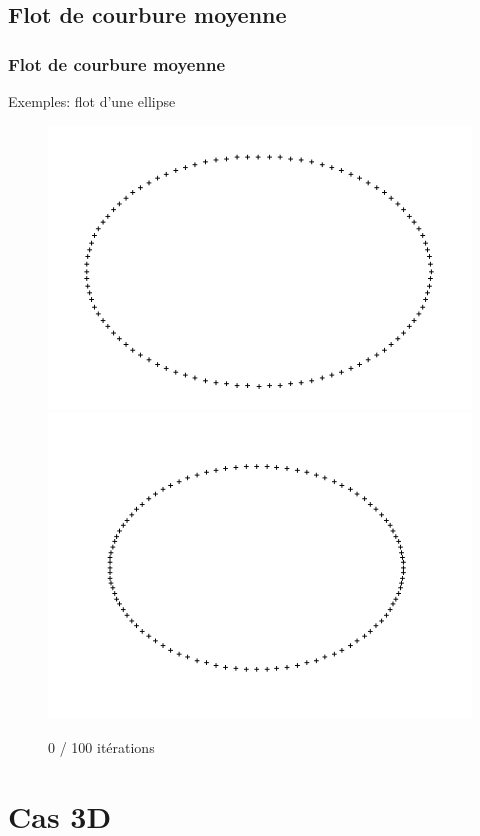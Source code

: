 \documentclass{beamer}
\begin{document}
\subsection{Flot de courbure moyenne}
\begin{frame}
    \frametitle{Flot de courbure moyenne}

    Exemples: flot d'une ellipse
    \begin{figure}
        \centering
        \includegraphics[scale=0.3]{img/ellipse-100-01-15}
        \includegraphics[scale=0.3]{img/ellipse-100-01-15-100}
        \caption{0 / 100 itérations}
    \end{figure}
\end{frame}

\section{Cas 3D}
\end{document}

